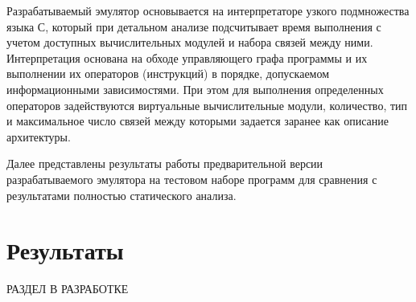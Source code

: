 \documentclass[utf8]{psta}%
\begin{document}
Разрабатываемый эмулятор основывается на интерпретаторе узкого подмножества языка С, который при детальном анализе подсчитывает время выполнения с учетом доступных вычислительных модулей и набора связей между ними. Интерпретация основана на обходе управляющего графа программы и их выполнении их операторов (инструкций) в порядке, допускаемом информационными зависимостями. При этом для выполнения определенных операторов задействуются виртуальные вычислительные модули, количество, тип и максимальное число связей между которыми задается заранее как описание архитектуры.

Далее представлены результаты работы предварительной версии разрабатываемого эмулятора на тестовом наборе программ для сравнения с результатами полностью статического анализа.
  
\section{Результаты}

РАЗДЕЛ В РАЗРАБОТКЕ
   



% 


\end{document}
